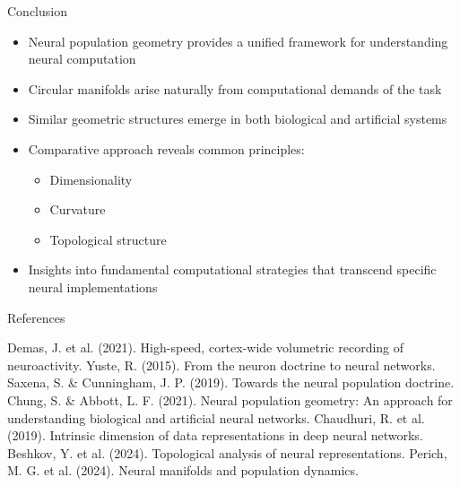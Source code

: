 \documentclass[aspectratio=169]{beamer}
\begin{document}
\begin{frame}{Conclusion}
    \begin{itemize}
        \item Neural population geometry provides a unified framework for understanding neural computation
        \item Circular manifolds arise naturally from computational demands of the task
        \item Similar geometric structures emerge in both biological and artificial systems
        \item Comparative approach reveals common principles:
        \begin{itemize}
            \item Dimensionality
            \item Curvature
            \item Topological structure
        \end{itemize}
        \item Insights into fundamental computational strategies that transcend specific neural implementations
    \end{itemize}
\end{frame}

\begin{frame}{References}
    \begin{thebibliography}{10}
         Demas, J. et al. (2021). High-speed, cortex-wide volumetric recording of neuroactivity.
         Yuste, R. (2015). From the neuron doctrine to neural networks.
         Saxena, S. \& Cunningham, J. P. (2019). Towards the neural population doctrine.
         Chung, S. \& Abbott, L. F. (2021). Neural population geometry: An approach for understanding biological and artificial neural networks.
         Chaudhuri, R. et al. (2019). Intrinsic dimension of data representations in deep neural networks.
         Beshkov, Y. et al. (2024). Topological analysis of neural representations.
         Perich, M. G. et al. (2024). Neural manifolds and population dynamics.
    \end{thebibliography}
\end{frame}
\end{document}
